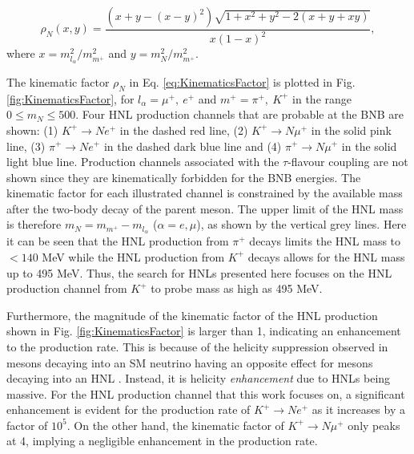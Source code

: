 \begin{equation}
	\rho_{N}(x,y) = \frac{(x+y-(x-y)^{2})\sqrt{1+x^{2}+y^{2}-2(x+y+xy)}}{x(1-x)^{2}},
\label{eq:KinematicsFactor}
\end{equation}
where $x = m^{2}_{l_{\alpha}}/m^{2}_{m^+}$ and $y=m^{2}_{N}/m^{2}_{m^+}$.

The kinematic factor $\rho_N$ in Eq. \ref{eq:KinematicsFactor} is plotted in Fig. \ref{fig:KinematicsFactor}, for $l_{\alpha} = \mu^+,\ e^+$ and $m^+ = \pi^+,\ K^+$ in the range $0 \leq m_N \leq 500$.
Four HNL production channels that are probable at the BNB are shown: (1) $K^+ \rightarrow Ne^+$ in the dashed red line, (2) $K^+ \rightarrow N\mu^+$ in the solid pink line, (3) $\pi^+ \rightarrow Ne^
+$ in the dashed dark blue line and (4) $\pi^+ \rightarrow N\mu^+$ in the solid light blue line.  
Production channels associated with the $\tau$-flavour coupling are not shown since they are kinematically forbidden for the BNB energies.
The kinematic factor for each illustrated channel is constrained by the available mass after the two-body decay of the parent meson.
The upper limit of the HNL mass is therefore $m_{N} = m_{m^+} - m_{l_{\alpha}}$ ($\alpha=e,\mu$), as shown by the vertical grey lines.
Here it can be seen that the HNL production from $\pi^+$ decays limits the HNL mass to $< 140$ MeV while the HNL production from $K^+$ decays allows for the HNL mass up to 495 MeV. 
Thus, the search for HNLs presented here focuses on the HNL production channel from $K^+$ to probe mass as high as 495 MeV.



Furthermore, the magnitude of the kinematic factor of the HNL production shown in Fig. \ref{fig:KinematicsFactor} is larger than 1, indicating an enhancement to the production rate.
This is because of the helicity suppression observed in mesons decaying into an SM neutrino having an opposite effect for mesons decaying into an HNL \cite{HNLKelly}.
Instead, it is helicity \textit{enhancement} due to HNLs being massive.
For the HNL production channel that this work focuses on, a significant enhancement is evident for the production rate of $K^+\rightarrow  N e^+$ as it increases by a factor of $10^{5}$.
On the other hand, the kinematic factor of $K^+ \rightarrow N \mu^+ $ only peaks at 4, implying a negligible enhancement in the production rate.

